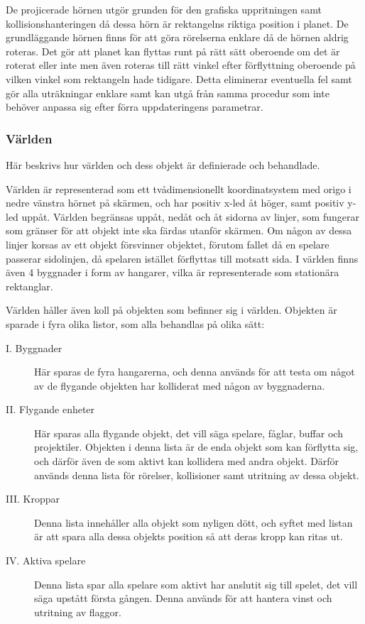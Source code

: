 \documentclass[12pt,a4paper]{article}
\newcounter{subsubsubsection}[subsubsection]
\begin{document}
De projicerade hörnen utgör grunden för den grafiska uppritningen samt kollisionshanteringen då dessa hörn är rektangelns riktiga position i planet. De grundläggande hörnen finns för att göra rörelserna enklare då de hörnen aldrig roteras. Det gör att planet kan flyttas runt på rätt sätt oberoende om det är roterat eller inte men även roteras till rätt vinkel efter förflyttning oberoende på vilken vinkel som rektangeln hade tidigare. Detta eliminerar eventuella fel samt gör alla uträkningar enklare samt kan utgå från samma procedur som inte behöver anpassa sig efter förra uppdateringens parametrar.


\subsubsection{Världen}

Här beskrivs hur världen och dess objekt är definierade och behandlade.

Världen är representerad som ett tvådimensionellt koordinatsystem med origo i nedre vänstra hörnet på skärmen, och har positiv x-led åt höger, samt positiv y-led uppåt. Världen begränsas uppåt, nedåt och åt sidorna av linjer, som fungerar som gränser för att objekt inte ska färdas utanför skärmen. Om någon av dessa linjer korsas av ett objekt försvinner objektet, förutom fallet då en spelare passerar sidolinjen, då spelaren istället förflyttas till motsatt sida. I världen finns även 4 byggnader i form av hangarer, vilka är representerade som stationära rektanglar.


Världen håller även koll på objekten som befinner sig i världen. Objekten är sparade i fyra olika listor, som alla behandlas på olika sätt:

\begin{description}
	\item [  I. Byggnader] Här sparas de fyra hangarerna, och denna används för att testa om något av de flygande objekten har kolliderat med någon av byggnaderna.
	
	\item [  II. Flygande enheter] Här sparas alla flygande objekt, det vill säga spelare, fåglar, buffar och projektiler. Objekten i denna lista är de enda objekt som kan förflytta sig, och därför även de som aktivt kan kollidera med andra objekt. Därför används denna lista för rörelser, kollisioner samt utritning av dessa objekt.
	
	\item [  III. Kroppar] Denna lista innehåller alla objekt som nyligen dött, och syftet med listan är att spara alla dessa objekts position så att deras kropp kan ritas ut.
	
	
	\item [  IV. Aktiva spelare] Denna lista spar alla spelare som aktivt har anslutit sig till spelet, det vill säga upstått första gången. Denna används för att hantera vinst och utritning av flaggor.
\end{description}
\end{document}

